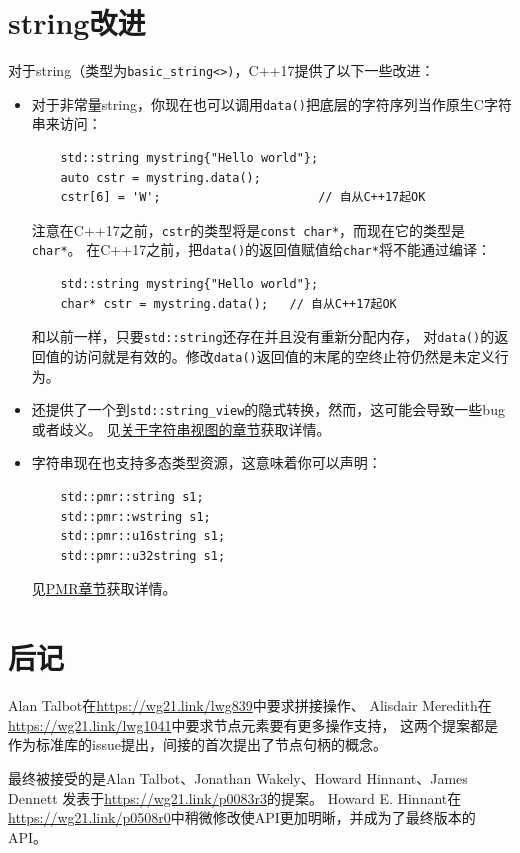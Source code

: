 \section{string改进}
对于string（类型为\texttt{basic\_string<>)}，C++17提供了以下一些改进：
\begin{itemize}
    \item 对于非常量string，你现在也可以调用\texttt{data()}把底层的字符序列当作原生C字符串来访问：
    \begin{lstlisting}
    std::string mystring{"Hello world"};
    auto cstr = mystring.data();
    cstr[6] = 'W';                      // 自从C++17起OK
    \end{lstlisting}
    注意在C++17之前，\texttt{cstr}的类型将是\texttt{const char*}，而现在它的类型是\texttt{char*}。
    在C++17之前，把\texttt{data()}的返回值赋值给\texttt{char*}将不能通过编译：
    \begin{lstlisting}
    std::string mystring{"Hello world"};
    char* cstr = mystring.data();   // 自从C++17起OK
    \end{lstlisting}
    和以前一样，只要\texttt{std::string}还存在并且没有重新分配内存，
    对\texttt{data()}的返回值的访问就是有效的。修改\texttt{data()}返回值的末尾的空终止符仍然是未定义行为。
    \item 还提供了一个到\texttt{std::string\_view}的隐式转换，然而，这可能会导致一些bug或者歧义。
    见\hyperref[ch19]{关于字符串视图的章节}获取详情。
    \item 字符串现在也支持多态类型资源，这意味着你可以声明：
    \begin{lstlisting}
    std::pmr::string s1;
    std::pmr::wstring s1;
    std::pmr::u16string s1;
    std::pmr::u32string s1;
    \end{lstlisting}
    见\hyperref[ch29]{PMR章节}获取详情。
\end{itemize}


\section{后记}
Alan Talbot在\url{https://wg21.link/lwg839}中要求拼接操作、
Alisdair Meredith在\url{https://wg21.link/lwg1041}中要求节点元素要有更多操作支持，
这两个提案都是作为标准库的issue提出，间接的首次提出了节点句柄的概念。

最终被接受的是Alan Talbot、Jonathan Wakely、Howard Hinnant、James Dennett
发表于\url{https://wg21.link/p0083r3}的提案。
Howard E. Hinnant在\url{https://wg21.link/p0508r0}中稍微修改使API更加明晰，并成为了最终版本的API。

